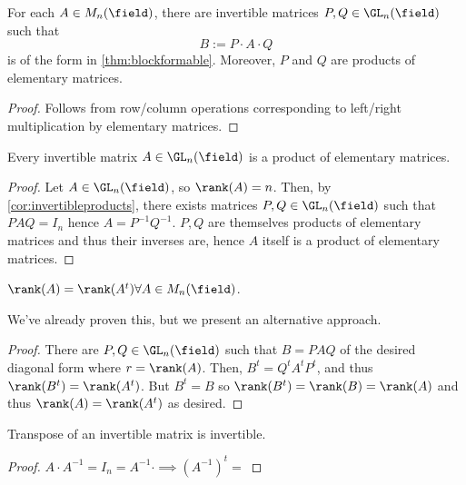 \begin{corollary}\label{cor:invertibleproducts}
    For each $A \in M_n(\field)$, there are invertible matrices $P, Q \in \GL_n(\field)$ such that \[
    B := P \cdot A \cdot Q    
    \]
    is of the form in \cref{thm:blockformable}. Moreover, $P$ and $Q$ are products of elementary matrices.
\end{corollary}

\begin{proof}
    Follows from row/column operations corresponding to left/right multiplication by elementary matrices.
\end{proof}

\begin{corollary}
    Every invertible matrix $A \in \GL_n(\field)$ is a product of elementary matrices.
\end{corollary}
\begin{proof}
    Let $A \in \GL_n(\field)$, so $\rank(A) = n$. Then, by \cref{cor:invertibleproducts}, there exists matrices $P, Q \in \GL_n(\field)$ such that $P A Q = I_n$ hence $A = P^{-1}Q^{-1}$. $P,Q$ are themselves products of elementary matrices and thus their inverses are, hence $A$ itself is a product of elementary matrices.
\end{proof}

\begin{corollary}
    $\rank(A) = \rank(A^t) \forall A \in M_n(\field)$.
\end{corollary}

\begin{remark}
    We've already proven this, but we present an alternative approach.
\end{remark}

\begin{proof}
    There are $P, Q \in \GL_n(\field)$ such that $B = PAQ$ of the desired diagonal form where $r = \rank(A)$. Then, $B^t = Q^t A^t P^t$, and thus $\rank(B^t) = \rank(A^t)$. But $B^t = B$ so $\rank(B^t) = \rank(B) = \rank(A)$ and thus $\rank(A) = \rank(A^t)$ as desired.
\end{proof}

\begin{corollary}
    Transpose of an invertible matrix is invertible.
\end{corollary}
\begin{proof}  
    $A \cdot A^{-1} = I_n = A^{-1}\cdot \implies (A^{-1})^t = $ %
\end{proof}